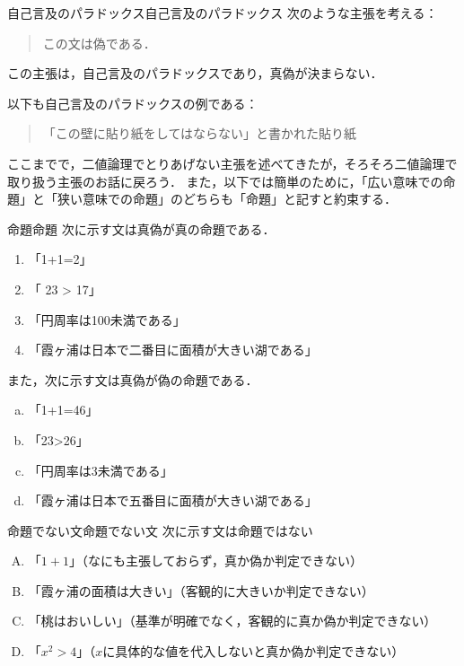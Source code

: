 \documentclass[a4paper,11pt]{ltjsarticle}
\begin{document}
\begin{example}{自己言及のパラドックス}{自己言及のパラドックス}
	次のような主張を考える：
	\begin{quote}
		この文は偽である．
	\end{quote}
	この主張は，自己言及のパラドックスであり，真偽が決まらない．
	
	以下も自己言及のパラドックスの例である：
	\begin{quote}
		「この壁に貼り紙をしてはならない」と書かれた貼り紙
	\end{quote}
\end{example}

ここまでで，二値論理でとりあげない主張を述べてきたが，そろそろ二値論理で取り扱う主張のお話に戻ろう．
また，以下では簡単のために，「広い意味での命題」と「狭い意味での命題」のどちらも「命題」と記すと約束する．

\begin{example}{命題}{命題}
    次に示す文は真偽が真の命題である．
    \begin{enumerate}[(1)]
        \item 「1+1=2」
        \item 「 23 > 17」
        \item 「円周率は100未満である」
        \item 「霞ヶ浦は日本で二番目に面積が大きい湖である」
    \end{enumerate}
    また，次に示す文は真偽が偽の命題である．
    \begin{enumerate}[(a)]
        \item 「1+1=46」
        \item 「23>26」
        \item 「円周率は3未満である」
        \item 「霞ヶ浦は日本で五番目に面積が大きい湖である」
    \end{enumerate}
\end{example}

\begin{example}{命題でない文}{命題でない文}
    次に示す文は命題ではない
    \begin{enumerate}[(A)]
    \item 「$1+1$」（なにも主張しておらず，真か偽か判定できない）
    \item 「霞ヶ浦の面積は大きい」（客観的に大きいか判定できない）
    \item 「桃はおいしい」（基準が明確でなく，客観的に真か偽か判定できない）
    \item 「$x^2 > 4$」（$x$に具体的な値を代入しないと真か偽か判定できない）\label{enu:命題でない文4}
    \end{enumerate}
\end{example}
\end{document}
